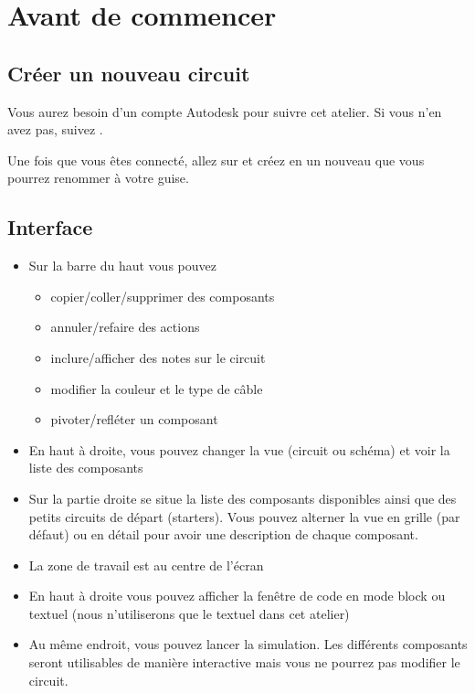 \section{Avant de commencer}
\subsection{Créer un nouveau circuit}
Vous aurez besoin d'un compte Autodesk pour suivre cet atelier.
Si vous n'en avez pas, suivez .

Une fois que vous êtes connecté, allez sur  et créez en un nouveau que vous pourrez renommer à votre guise.

\subsection{Interface}

\begin{itemize}
	\item Sur la barre du haut vous pouvez
	\begin{itemize}
		\item copier/coller/supprimer des composants
		\item annuler/refaire des actions
		\item inclure/afficher des notes sur le circuit
		\item modifier la couleur et le type de câble
		\item pivoter/refléter un composant
	\end{itemize}
	\item En haut à droite, vous pouvez changer la vue (circuit ou schéma) et voir la liste des composants
	\item Sur la partie droite se situe la liste des composants disponibles ainsi que des petits circuits de départ (starters).
		  Vous pouvez alterner la vue en grille (par défaut) ou en détail pour avoir une description de chaque composant.
	\item La zone de travail est au centre de l'écran
	\item En haut à droite vous pouvez afficher la fenêtre de code en mode block ou textuel (nous n'utiliserons que le textuel dans cet atelier)
	\item Au même endroit, vous pouvez lancer la simulation.
		  Les différents composants seront utilisables de manière interactive mais vous ne pourrez pas modifier le circuit.
\end{itemize}